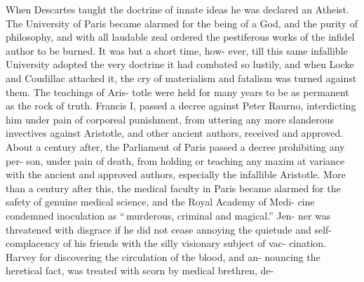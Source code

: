 \documentclass[10pt]{article}
\begin{document}
\begin{multicols}{3}
When Descartes taught the doctrine of innate ideas he was declared an\linebreak
Atheist. The University of Paris became alarmed for the being of a God, and\linebreak
the purity of philosophy, and with all laudable zeal ordered the pestiferous\linebreak
works of the infidel author to be burned. It was but a short time, how-\linebreak
ever, till this same infallible University adopted the very doctrine it had\linebreak
combated so lustily, and when Locke and Coudillac attacked it, the cry of\linebreak
materialism and fatalism was turned against them. The teachings of Aris-\linebreak
totle were held for many years to be as permanent as the rock of truth.\linebreak
Francis I, passed a decree against Peter Raurno, interdicting him under\linebreak
pain of corporeal punishment, from uttering any more slanderous invectives\linebreak
against Aristotle, and other ancient authors, received and approved. About\linebreak
a century after, the Parliament of Paris passed a decree prohibiting any per-\linebreak
son, under pain of death, from holding or teaching any maxim at variance\linebreak
with the ancient and approved authors, especially the infallible Aristotle.\linebreak
More than a century after this, the medical faculty in Paris became alarmed\linebreak
for the safety of genuine medical science, and the Royal Academy of Medi-\linebreak
cine condemned inoculation as ``\,murderous, criminal and magical.'' Jen-\linebreak
ner was threatened with disgrace if he did not cease annoying the quietude\linebreak
and self-complacency of his friends with the silly visionary subject of vac-\linebreak
cination. Harvey for discovering the circulation of the blood, and an-\linebreak
nouncing the heretical fact, was treated with scorn by medical brethren, de-\linebreak

\end{multicols}
\end{document}
